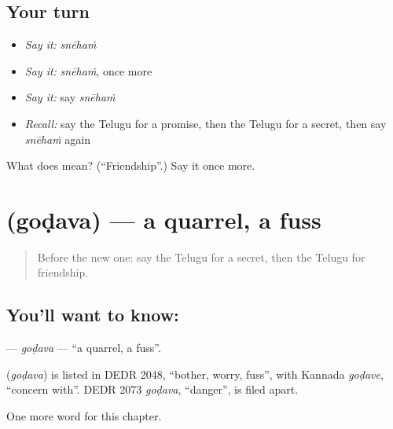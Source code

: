 \subsection*{Your turn}
\begin{itemize}
\raggedright
  \item \emph{Say it:} \emph{snēhaṁ}
  \item \emph{Say it:} \emph{snēhaṁ}, once more
  \item \emph{Say it:} say \emph{snēhaṁ}
  \item \emph{Recall:} say the Telugu for a promise, then the Telugu for a secret, then say \emph{snēhaṁ} again
\end{itemize}

\begin{tcolorbox}[breakable,colback=teal!4,colframe=teal!35!black,title={Before you move on}]
What does  mean? (\textquotedblleft{}Friendship\textquotedblright{}.) Say it once more.
\end{tcolorbox}
\section[\texorpdfstring{\te{గొడవ} (goḍava)}{గొడవ (goḍava)}]{ (goḍava) — a quarrel, a fuss}

\label{lesson:TE-C257-godava}



\begin{quote}
Before the new one: say the Telugu for a secret, then the Telugu for friendship.
\end{quote}

\subsection*{You'll want to know: }
\textbf{} — \emph{goḍava} — \textquotedblleft{}a quarrel, a fuss\textquotedblright{}.

\begin{cousinweb}
\textbf{} (\emph{goḍava}) is listed in DEDR 2048, \textquotedblleft{}bother, worry, fuss\textquotedblright{}, with Kannada \emph{goḍave}, \textquotedblleft{}concern with\textquotedblright{}. DEDR 2073 \emph{goḍava}, \textquotedblleft{}danger\textquotedblright{}, is filed apart.
\end{cousinweb}

\begin{grammarlens}[title={What you've built}]
One more word for this chapter.
\end{grammarlens}

